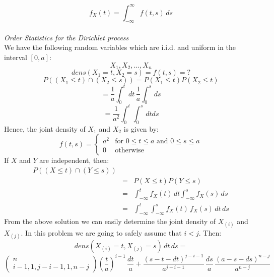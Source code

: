 \begin{displaymath}
f_X(t) = \int_{-\infty}^\infty f(t,s)\, ds
\end{displaymath}\\
{\em Order Statistics for the Dirichlet process}\\
We have the following random variables which are i.i.d. and uniform in the 
interval $[0,a]$:
\begin{displaymath}
X_1, X_2, \ldots, X_n
\end{displaymath}
\begin{displaymath}
dens(X_1 = t, X_2 = s) = f(t,s) =  ?
\end{displaymath}
\begin{displaymath}
P((X_1 \leq t) \cap (X_2 \leq s)) = P(X_1 \leq t) P(X_2 \leq t)
\end{displaymath}
\begin{displaymath}
=\frac {1} {a} \int_0^t \, dt \, \frac {1} {a} \int_0^s \, ds
\end{displaymath}
\begin{displaymath}
= \frac{1} {a^2} \int_0^t \int_0^s \, dt ds
\end{displaymath}
Hence, the joint density of $X_1$ and $X_2$ is given by:
\begin{displaymath}
f(t,s) = \left\{ \begin{array}{ll}
 a^2  & \mbox{for $0 \leq t \leq a$ and $0 \leq s \leq a$}\\ 
 0    & \mbox{otherwise} \end{array}\right.
\end{displaymath}
If $X$ and $Y$ are independent, then:
\begin{eqnarray*}
P((X \leq t) \cap (Y \leq s))& &\\
& = & P(X \leq t) P (Y \leq s)\\
& = & \int_{-\infty}^t f_X(t) \, dt \int_{-\infty}^s f_X(s)\,ds\\
& = & \int_{-\infty}^t \int_{-\infty}^s f_X(t)\,f_X(s)\,dt \, ds
\end{eqnarray*}
From the above solution we can easily determine the joint density of
$X_{(i)}$ and $X_{(j)}$.  In this problem we are going to safely assume that
$i < j$.  Then:
\begin{displaymath}
dens(X_{(i)} = t, X_{(j)} = s )\,dt\,ds = 
\end{displaymath}
\begin{displaymath}
\left(\begin{array}{c} n\\ i-1, 1, j-i-1,1,n-j \end{array}\right) \left( \frac {t} {a} \right)^{i-1}\, \frac {dt} {a} + \frac {(s-t-dt)^{j-i-1}} {a^{j-i-1}} 
\, \frac {ds} {a} \, \frac{(a-s-ds)^{n-j}} {a^{n-j}}
\end{displaymath}
